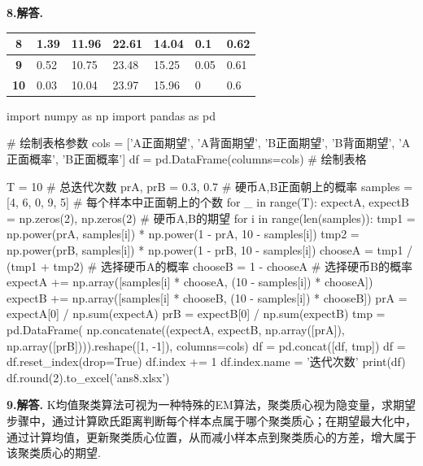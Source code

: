 \documentclass[12pt, a4paper, oneside]{ctexart}
\newenvironment{solution}[1][]{\par\noindent\textbf{#1解答. }}{\smallskip\par}  %
\begin{document}
\begin{solution}[8.]
\begin{table}[htbp]
\begin{tabular}{cllllll}
        \midrule
\textbf{8}    & 1.39                               & 11.96                              & 22.61                              & 14.04                              & 0.1                                & 0.62                               \\
        \midrule
\textbf{9}    & 0.52                               & 10.75                              & 23.48                              & 15.25                              & 0.05                               & 0.61                               \\
        \midrule
\textbf{10}   & 0.03                               & 10.04                              & 23.97                              & 15.96                              & 0                                  & 0.6                               \\
        \bottomrule
\end{tabular}
\end{table}
\begin{pythoncode}
import numpy as np
import pandas as pd

# 绘制表格参数
cols = ['A正面期望', 'A背面期望', 'B正面期望', 'B背面期望', 'A正面概率', 'B正面概率']
df = pd.DataFrame(columns=cols)  # 绘制表格

T = 10  # 总迭代次数
prA, prB = 0.3, 0.7  # 硬币A,B正面朝上的概率
samples = [4, 6, 0, 9, 5]  # 每个样本中正面朝上的个数
for _ in range(T):
    expectA, expectB = np.zeros(2), np.zeros(2)  # 硬币A,B的期望
    for i in range(len(samples)):
        tmp1 = np.power(prA, samples[i]) * np.power(1 - prA, 10 - samples[i])
        tmp2 = np.power(prB, samples[i]) * np.power(1 - prB, 10 - samples[i])
        chooseA = tmp1 / (tmp1 + tmp2)  # 选择硬币A的概率
        chooseB = 1 - chooseA  # 选择硬币B的概率
        expectA += np.array([samples[i] * chooseA, (10 - samples[i]) * chooseA])
        expectB += np.array([samples[i] * chooseB, (10 - samples[i]) * chooseB])
    prA = expectA[0] / np.sum(expectA)
    prB = expectB[0] / np.sum(expectB)
    tmp = pd.DataFrame(
        np.concatenate((expectA, expectB, np.array([prA]), np.array([prB]))).reshape([1, -1]),
        columns=cols)
    df = pd.concat([df, tmp])
df = df.reset_index(drop=True)
df.index += 1
df.index.name = '迭代次数'
print(df)
df.round(2).to_excel('ans8.xlsx')
\end{pythoncode}
\end{solution}
\begin{solution}[9.]
    K均值聚类算法可视为一种特殊的EM算法，聚类质心视为隐变量，求期望步骤中，通过计算欧氏距离判断每个样本点属于哪个聚类质心；在期望最大化中，通过计算均值，更新聚类质心位置，从而减小样本点到聚类质心的方差，增大属于该聚类质心的期望.
\end{solution}
\end{document}
